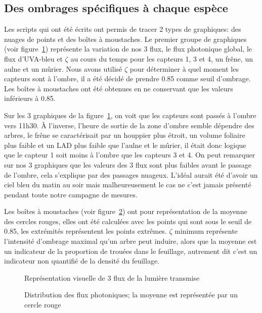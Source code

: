 \documentclass[12pt]{report}
\begin{document}
\subsection{Des ombrages spécifiques à chaque espèce}

Les scripts qui ont été écrits ont permis de tracer 2 types de graphiques: des
nuages de points et des boîtes à moustaches. Le premier groupe de graphiques
(voir figure~\ref{fig:flux}) représente la variation de nos 3 flux, le flux
photonique global, le flux d'UVA-bleu et $\zeta$ au cours du temps pour les capteurs
1, 3 et 4, un frêne, un aulne et un mûrier. Nous avons utilisé $\zeta$ pour
déterminer à quel moment les capteurs sont à l'ombre, il a été décidé de prendre
0.85 comme seuil d'ombrage. Les boîtes à moustaches ont été obtenues en ne
conservant que les valeurs inférieurs à 0.85.

Sur les 3 graphiques de la figure~\ref{fig:flux}, on voit que les capteurs sont
passés à l'ombre vers 11h30. À l'inverse, l'heure de sortie de la zone d'ombre
semble dépendre des arbres, le frêne se caractérisait par un houppier plus
étroit, un volume foliaire plus faible et un LAD plus faible que l'aulne et le
mûrier, il était donc logique que le capteur 1 soit moins à l'ombre que les
capteurs 3 et 4. On peut remarquer sur nos 3 graphiques que les valeurs des 3
flux sont plus faibles avant le passage de l'ombre, cela s'explique par des
passages nuageux. L'idéal aurait été d'avoir un ciel bleu du matin au soir mais
malheureusement le cas ne c'est jamais présenté pendant toute notre campagne de
mesures.

Les boîtes à moustaches (voir figure~\ref{fig:boxplots}) ont pour représentation de la
moyenne des cercles rouges, elles ont été calculées avec les points qui sont
sous le seuil de 0.85, les extrémités représentent les points extrêmes. $\zeta$
minimum représente l'intensité d'ombrage maximal qu'un arbre peut induire, alors
que la moyenne est un indicateur de la proportion de trouées dans le feuillage,
autrement dit c'est un indicateur non quantifié de la densité du feuillage.

\begin{figure}[!b]
  \centering
  \begin{tiny}
    
  \end{tiny}
  \caption{Représentation visuelle de 3 flux de la lumière transmise\label{fig:flux}}
\end{figure}
\begin{figure}
  \centering
  \begin{small}
    
  \end{small}
  \caption{Distribution des flux photoniques; la moyenne est représentée par un
    cercle rouge\label{fig:boxplots}}
\end{figure}
\end{document}
